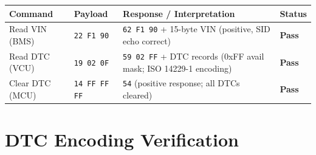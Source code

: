 \documentclass[12pt, a4paper, openany]{report}
\begin{document}
\begin{table}[!ht]
\centering\small
\begin{tabularx}{\textwidth}{llXl}
  \toprule
  \rowcolor{TblHead}
  \color{white}\textbf{Command} &
  \color{white}\textbf{Payload} &
  \color{white}\textbf{Response / Interpretation} &
  \color{white}\textbf{Status} \\
  \midrule
  Read VIN (BMS)
    & \texttt{22 F1 90}
    & \texttt{62 F1 90} + 15-byte VIN (positive, SID echo correct)
    & \color{GreenOK}\textbf{Pass} \\
  \rowcolor{TblAlt}
  Read DTC (VCU)
    & \texttt{19 02 0F}
    & \texttt{59 02 FF} + DTC records (0xFF avail mask; ISO 14229-1 encoding)
    & \color{GreenOK}\textbf{Pass} \\
  Clear DTC (MCU)
    & \texttt{14 FF FF FF}
    & \texttt{54} (positive response; all DTCs cleared)
    & \color{GreenOK}\textbf{Pass} \\
  \bottomrule
\end{tabularx}
\end{table}

\section{DTC Encoding Verification}
\end{document}

